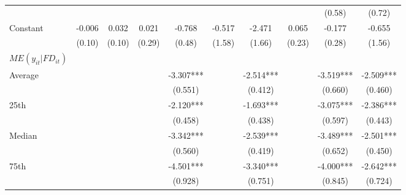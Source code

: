 \documentclass[12pt, a4paper]{article}
\begin{document}
\begin{table}[htbp]
\begin{threeparttable}
{\begin{tabular}{l*{9}{c}}
				&                     &                     &                     &                     &                     &                     &                     &      (0.58)         &      (0.72)         \\
				Constant            &      -0.006         &       0.032         &       0.021         &      -0.768         &      -0.517         &      -2.471         &       0.065         &      -0.177         &      -0.655         \\
				&      (0.10)         &      (0.10)         &      (0.29)         &      (0.48)         &      (1.58)         &      (1.66)         &      (0.23)         &      (0.28)         &      (1.56)         \\
				\hline
				$ME(y_{it}|FD_{it})$ \\
				Average & & & & -3.307*** & & -2.514*** & & -3.519*** & -2.509*** \\
				& & & & (0.551) & & (0.412) & & (0.660) & (0.460)   \\
				
				25th & & & & -2.120*** & & -1.693*** & & -3.075*** & -2.386*** \\
				& & & & (0.458) & & (0.438) & & (0.597) & (0.443)\\ 
				
				Median & & & &	-3.342*** & & -2.539*** & &	-3.489*** & -2.501*** \\
				& & & & (0.560) & & (0.419) & & (0.652) & (0.450) \\ 
				
				75th & & & & -4.501*** & & -3.340*** & & -4.000*** & -2.642***\\
				& & & & (0.928)  & & (0.751)  & & (0.845)  & (0.724) \\
				

\end{tabular}}
\end{threeparttable}
\end{table}
\end{document}
